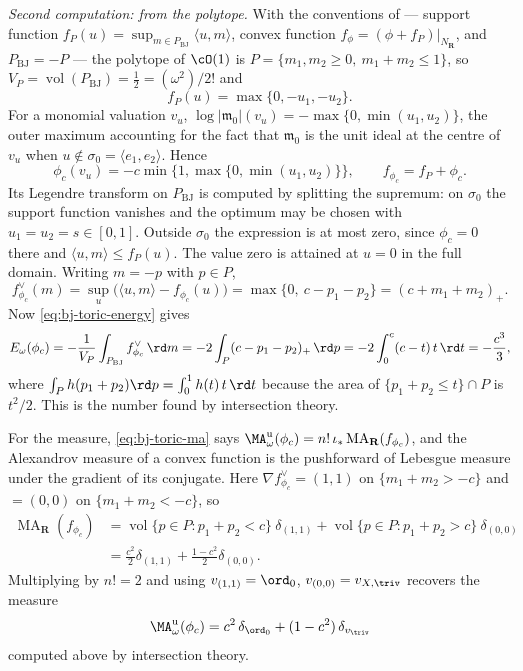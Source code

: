 \begin{example}
\emph{Second computation: from the polytope.}  With the conventions of
 --- support function
$f_P(u)=\sup_{m\in P_{\mathrm{BJ}}}\langle u,m\rangle$, convex function
$f_\phi=(\phi+f_P)|_{N_{\mathbf R}}$, and
$P_{\mathrm{BJ}}=-P$ --- the polytope of $\cO(1)$ is
$P=\{m_1,m_2\ge0,\ m_1+m_2\le1\}$, so
$V_P=\operatorname{vol}(P_{\mathrm{BJ}})=\tfrac12=(\omega^2)/2!$ and
\[
 f_P(u)=\max\{0,-u_1,-u_2\}.
\]
For a monomial valuation $v_u$, $\log|\mathfrak m_0|(v_u)
=-\max\{0,\min(u_1,u_2)\}$, the outer maximum accounting for the fact that
$\mathfrak m_0$ is the unit ideal at the centre of $v_u$ when
$u\notin\sigma_0=\langle e_1,e_2\rangle$.  Hence
\[
 \phi_c(v_u)=-c\min\bigl\{1,\max\{0,\min(u_1,u_2)\}\bigr\},
 \qquad
 f_{\phi_c}=f_P+\phi_c .
\]
Its Legendre transform on $P_{\mathrm{BJ}}$ is computed by splitting the
supremum: on $\sigma_0$ the support function vanishes and the optimum
may be chosen with $u_1=u_2=s\in[0,1]$.  Outside $\sigma_0$ the
expression is at most zero, since $\phi_c=0$ there and
$\langle u,m\rangle\le f_P(u)$.  The value zero is attained at $u=0$
in the full domain.  Writing $m=-p$ with $p\in P$,
\[
 f_{\phi_c}^\vee(m)
 =\sup_{u}\bigl(\langle u,m\rangle-f_{\phi_c}(u)\bigr)
 =\max\{0,\ c-p_1-p_2\}
 =(c+m_1+m_2)_+ .
\]
Now \eqref{eq:bj-toric-energy} gives
\[
 E_\omega(\phi_c)
 =-\frac1{V_P}\int_{P_{\mathrm{BJ}}}f_{\phi_c}^\vee\,\rd m
 =-2\int_P(c-p_1-p_2)_+\,\rd p
 =-2\int_0^{c}(c-t)\,t\,\rd t
 =-\frac{c^3}{3},
\]
where $\int_Ph(p_1+p_2)\rd p=\int_0^1h(t)\,t\,\rd t$ because the area of
$\{p_1+p_2\le t\}\cap P$ is $t^2/2$.  This is the number found by
intersection theory.

For the measure, \eqref{eq:bj-toric-ma} says
$\MA^{\mathrm u}_\omega(\phi_c)=n!\,\iota_*\operatorname{MA}_{\mathbf R}
(f_{\phi_c})$, and the Alexandrov measure of a convex function is the
pushforward of Lebesgue measure under the gradient of its conjugate.  Here
$\nabla f_{\phi_c}^\vee=(1,1)$ on $\{m_1+m_2>-c\}$ and $=(0,0)$ on
$\{m_1+m_2<-c\}$, so
\[
\begin{aligned}
 \operatorname{MA}_{\mathbf R}(f_{\phi_c})
 &=\operatorname{vol}\{p\in P:p_1+p_2<c\}\ \delta_{(1,1)}
  +\operatorname{vol}\{p\in P:p_1+p_2>c\}\ \delta_{(0,0)}\\
 &=\frac{c^2}{2}\delta_{(1,1)}+\frac{1-c^2}{2}\delta_{(0,0)} .
\end{aligned}
\]
Multiplying by $n!=2$ and using $v_{(1,1)}=\ord_0$,
$v_{(0,0)}=v_{X,\triv}$ recovers the measure
\[
 \MA^{\mathrm u}_\omega(\phi_c)
  =c^2\,\delta_{\ord_0}+(1-c^2)\,\delta_{v_{\triv}}
\]
computed above by intersection theory.


\end{example}
